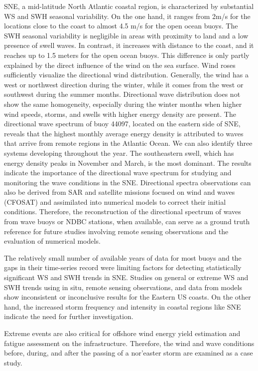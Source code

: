 SNE, a mid-latitude North Atlantic coastal region, is characterized by substantial WS and SWH seasonal variability. On the one hand, it ranges from 2m/s for the locations close to the coast to almost 4.5 m/s for the open ocean buoys. The SWH seasonal variability is negligible in areas with proximity to land and a low presence of swell waves. In contrast, it increases with distance to the coast, and it reaches up to 1.5 meters for the open ocean buoys. This difference is only partly explained by the direct influence of the wind on the sea surface. Wind roses sufficiently visualize the directional wind distribution. Generally, the wind has a west or northwest direction during the winter, while it comes from the west or southwest during the summer months. Directional wave distribution does not show the same homogeneity, especially during the winter months when higher wind speeds, storms, and swells with higher energy density are present. The directional wave spectrum of buoy 44097, located on the eastern side of SNE, reveals that the highest monthly average energy density is attributed to waves that arrive from remote regions in the Atlantic Ocean. We can also identify three systems developing throughout the year. The southeastern swell, which has energy density peaks in November and March, is the most dominant. The results indicate the importance of the directional wave spectrum for studying and monitoring the wave conditions in the SNE. Directional spectra observations can also be derived from SAR and satellite missions focused on wind and waves (CFOSAT) and assimilated into numerical models to correct their initial conditions. Therefore, the reconstruction of the directional spectrum of waves from wave buoys or NDBC stations, when available, can serve as a ground truth reference for future studies involving remote sensing observations and the evaluation of numerical models.

The relatively small number of available years of data for most buoys and the gaps in their time-series record were limiting factors for detecting statistically significant WS and SWH trends in SNE. Studies on general or extreme WS and SWH trends using in situ, remote sensing observations, and data from models show inconsistent or inconclusive results \cite{Vose2014} for the Eastern US coasts. On the other hand, the increased storm frequency and intensity in coastal regions like SNE indicate the need for further investigation.

Extreme events are also critical for offshore wind energy yield estimation and fatigue assessment on the infrastructure. Therefore, the wind and wave conditions before, during, and after the passing of a nor’easter storm are examined as a case study.

